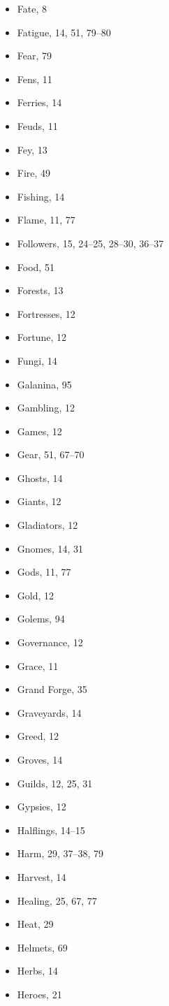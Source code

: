 \begin{multicols}{2}
\begin{itemize}
  \item Fate, 8
  \item Fatigue, 14, 51, 79--80
  \item Fear, 79
  \item Fens, 11
  \item Ferries, 14
  \item Feuds, 11
  \item Fey, 13
  \item Fire, 49
  \item Fishing, 14
  \item Flame, 11, 77
  \item Followers, 15, 24--25, 28--30, 36--37
  \item Food, 51
  \item Forests, 13
  \item Fortresses, 12
  \item Fortune, 12
  \item Fungi, 14
  \item Galanina, 95
  \item Gambling, 12
  \item Games, 12
  \item Gear, 51, 67--70
  \item Ghosts, 14
  \item Giants, 12
  \item Gladiators, 12
  \item Gnomes, 14, 31
  \item Gods, 11, 77
  \item Gold, 12
  \item Golems, 94
  \item Governance, 12
  \item Grace, 11
  \item Grand Forge, 35
  \item Graveyards, 14
  \item Greed, 12
  \item Groves, 14
  \item Guilds, 12, 25, 31
  \item Gypsies, 12
  \item Halflings, 14--15
  \item Harm, 29, 37--38, 79
  \item Harvest, 14
  \item Healing, 25, 67, 77
  \item Heat, 29
  \item Helmets, 69
  \item Herbs, 14
  \item Heroes, 21

\end{itemize}
\end{multicols}
